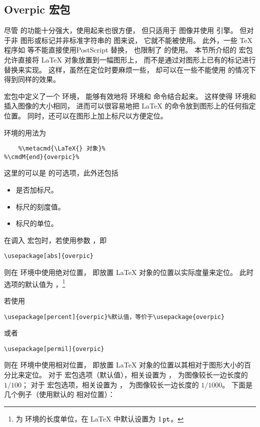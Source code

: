 \subsection{Overpic 宏包}\label{ssec:overpic}

尽管  的功能十分强大，使用起来也很方便，
但只适用于  图像并使用  引擎。
但对于非  图形或标记并非标准字符串的  图来说，
它就不能被使用。
此外，一些 \TeX{} 程序如  \pdfLaTeX{} 等不能直接使用PostScript 替换，
也限制了  的使用。
本节所介绍的  宏包允许直接将 \LaTeX{} 对象放置到一幅图形上，
而不是通过对图形上已有的标记进行替换来实现。
这样，虽然在定位时要麻烦一些，
却可以在一些不能使用  的情况下得到同样的效果。

 宏包中定义了一个  环境，
能够有效地将  环境和  命令结合起来。
这样使得  环境和插入图像的大小相同，
进而可以很容易地把 \LaTeX{} 的命令放到图形上的任何指定位置。
同时，还可以在图形上加上标尺以方便定位。

 环境的用法为
\begin{lstlisting}[escapechar=\%]
%\cmdMOM{begin}{overpic}{\metacmd{选项}}{\metacmd{图形}}%
	%\metacmd{\LaTeX{} 对象}%
%\cmdM{end}{overpic}%
\end{lstlisting}
这里的可以是  的可选项，此外还包括
\begin{itemize}
	\item {} 是否加标尺。
	\item {} 标尺的刻度值。
	\item {} 标尺的单位。
\end{itemize}

在调入  宏包时，若使用参数 ，即
\begin{lstlisting}
\usepackage[abs]{overpic}
\end{lstlisting}
则在  环境中使用绝对位置，
即放置 \LaTeX{} 对象的位置以实际度量来定位。
此时  选项的默认值为 ，\footnote{%
	 为  环境的长度单位，在 \LaTeX{} 中默认设置为 $1\,\mathtt{pt}$。}


若使用
\begin{lstlisting}
\usepackage[percent]{overpic}%默认值，等价于\usepackage{overpic}
\end{lstlisting}
或者
\begin{lstlisting}
\usepackage[permil]{overpic}
\end{lstlisting}
则在  环境中使用相对位置，
即放置 \LaTeX{} 对象的位置以其相对于图形大小的百分比来定位。
对于  宏包选项（默认值），相关设置为 ，
 为图像较长一边长度的 $1/100$；
对于  宏包选项，相关设置为 ，
 为图像较长一边长度的 $1/1000$。
下面是几个例子（使用默认的  相对位置）：


